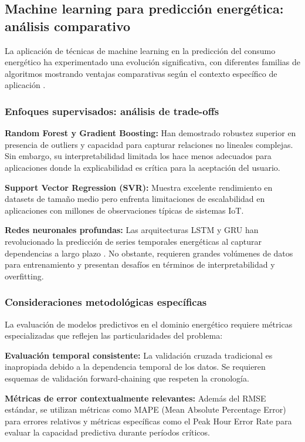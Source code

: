 \subsection{Machine learning para predicción energética: análisis comparativo}

La aplicación de técnicas de machine learning en la predicción del consumo energético ha experimentado una evolución significativa, con diferentes familias de algoritmos mostrando ventajas comparativas según el contexto específico de aplicación \cite{ahmad2018review}.

\subsubsection{Enfoques supervisados: análisis de trade-offs}

\textbf{Random Forest y Gradient Boosting:} Han demostrado robustez superior en presencia de outliers y capacidad para capturar relaciones no lineales complejas. Sin embargo, su interpretabilidad limitada los hace menos adecuados para aplicaciones donde la explicabilidad es crítica para la aceptación del usuario.

\textbf{Support Vector Regression (SVR):} Muestra excelente rendimiento en datasets de tamaño medio pero enfrenta limitaciones de escalabilidad en aplicaciones con millones de observaciones típicas de sistemas IoT.

\textbf{Redes neuronales profundas:} Las arquitecturas LSTM y GRU han revolucionado la predicción de series temporales energéticas al capturar dependencias a largo plazo \cite{shi2018deep}. No obstante, requieren grandes volúmenes de datos para entrenamiento y presentan desafíos en términos de interpretabilidad y overfitting.

\subsubsection{Consideraciones metodológicas específicas}

La evaluación de modelos predictivos en el dominio energético requiere métricas especializadas que reflejen las particularidades del problema:

\textbf{Evaluación temporal consistente:} La validación cruzada tradicional es inapropiada debido a la dependencia temporal de los datos. Se requieren esquemas de validación forward-chaining que respeten la cronología.

\textbf{Métricas de error contextualmente relevantes:} Además del RMSE estándar, se utilizan métricas como MAPE (Mean Absolute Percentage Error) para errores relativos y métricas específicas como el Peak Hour Error Rate para evaluar la capacidad predictiva durante períodos críticos.

